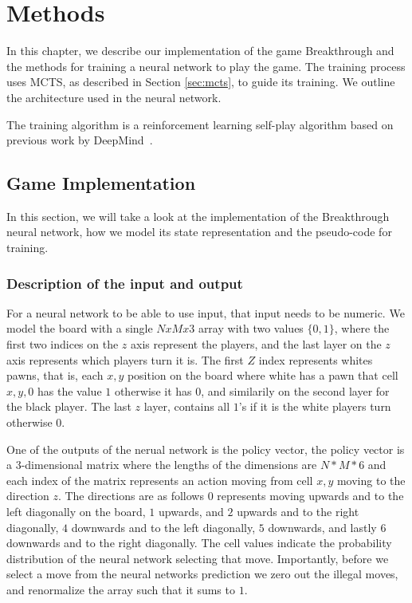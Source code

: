 \chapter{Methods}

\label{cha:methods}

In this chapter, we describe our implementation of the game Breakthrough and the methods for training a neural network to play the game. The training process uses MCTS, as described in Section \ref{sec:mcts}, to guide its training. We outline the architecture used in the neural network.

The training algorithm is a reinforcement learning self-play algorithm based on previous work by DeepMind~\cite{silver:alphagozero}.

\section{Game Implementation}

In this section, we will take a look at the implementation of the Breakthrough neural network, how we model its state representation and the pseudo-code for training.

\subsection{Description of the input and output}

For a neural network to be able to use input, that input needs to be numeric. We model the board with a single $NxMx3$ array with two values $\{0,1\}$, where the first two indices on the $z$ axis represent the players, and the last layer on the $z$ axis represents which players turn it is. The first $Z$ index represents whites pawns, that is, each $x,y$ position on the board where white has a pawn that cell $x,y,0$ has the value $1$ otherwise it has $0$, and similarily on the second layer for the black player. The last $z$ layer, contains all $1$'s if it is the white players turn otherwise $0$.

One of the outputs of the nerual network is the policy vector, the policy vector is a $3$-dimensional matrix where the lengths of the dimensions are $N * M * 6$ and each index of the matrix represents an action moving from cell $x,y$ moving to the direction $z$. The directions are as follows $0$ represents moving upwards and to the left diagonally on the board, $1$ upwards, and $2$ upwards and to the right diagonally, $4$ downwards and to the left diagonally, $5$ downwards, and lastly $6$ downwards and to the right diagonally. The cell values indicate the probability distribution of the neural network selecting that move. Importantly, before we select a move from the neural networks prediction we zero out the illegal moves, and renormalize the array such that it sums to $1$.

